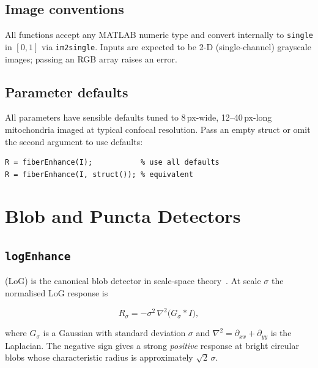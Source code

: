 \documentclass[a4paper, justified]{tufte-book}
\begin{document}
\section{Image conventions}

All functions accept any MATLAB numeric type and convert internally to
\texttt{single} in \([0,1]\) via \texttt{im2single}.  Inputs are expected to be
2-D (single-channel) grayscale images; passing an RGB array raises an error.

\section{Parameter defaults}

All parameters have sensible defaults tuned to 8\,px-wide, 12--40\,px-long
mitochondria imaged at typical confocal resolution.  Pass an empty struct or
omit the second argument to use defaults:
\begin{lstlisting}
R = fiberEnhance(I);           % use all defaults
R = fiberEnhance(I, struct()); % equivalent
\end{lstlisting}

\chapter{Blob and Puncta Detectors}
\label{ch:blobs}

\section{\texttt{logEnhance}}
\label{sec:log}

 (LoG) is the canonical blob detector in
scale-space theory~\cite{Marr1980,Lindeberg1998}.  At scale $\sigma$ the
normalised LoG response is

\begin{equation}
  R_\sigma = -\sigma^2\,\nabla^2\bigl(G_\sigma * I\bigr),
  \label{eq:log}
\end{equation}

where $G_\sigma$ is a Gaussian with standard deviation $\sigma$ and
$\nabla^2 = \partial_{xx} + \partial_{yy}$ is the Laplacian.  The negative
sign gives a strong \emph{positive} response at bright circular blobs whose
characteristic radius is approximately $\sqrt{2}\,\sigma$.
\end{document}
